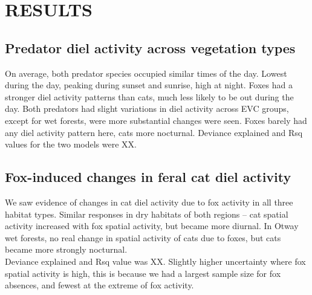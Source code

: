 \documentclass[]{elsarticle} %
\begin{document}
\newpage

\hypertarget{results}{%
\section{RESULTS}\label{results}}

\hypertarget{predator-diel-activity-across-vegetation-types}{%
\subsection{Predator diel activity across vegetation types}\label{predator-diel-activity-across-vegetation-types}}

On average, both predator species occupied similar times of the day. Lowest during the day, peaking during sunset and sunrise, high at night.
Foxes had a stronger diel activity patterns than cats, much less likely to be out during the day.
Both predators had slight variations in diel activity across EVC groups, except for wet forests, were more substantial changes were seen.
Foxes barely had any diel activity pattern here, cats more nocturnal.
Deviance explained and Rsq values for the two models were XX.

\hypertarget{fox-induced-changes-in-feral-cat-diel-activity}{%
\subsection{Fox-induced changes in feral cat diel activity}\label{fox-induced-changes-in-feral-cat-diel-activity}}

We saw evidence of changes in cat diel activity due to fox activity in all three habitat types. Similar responses in dry habitats of both regions -- cat spatial activity increased with fox spatial activity, but became more diurnal.
In Otway wet forests, no real change in spatial activity of cats due to foxes, but cats became more strongly nocturnal.\\
Deviance explained and Rsq value was XX.
Slightly higher uncertainty where fox spatial activity is high, this is because we had a largest sample size for fox absences, and fewest at the extreme of fox activity.

\newpage
\end{document}
